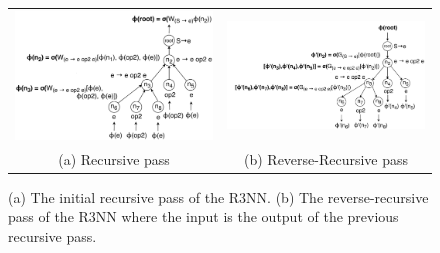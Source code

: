 \documentclass{article}
\begin{document}
\begin{figure}
    \begin{tabular}{cc}
        \begin{minipage}{0.45\linewidth}
            \includegraphics[scale=0.16]{figures/tree2.png}
        \end{minipage}
        &
        \begin{minipage}{0.55\linewidth}
            \includegraphics[scale=0.16]{figures/tree3.png}
        \end{minipage}
        \\
        (a) Recursive pass & (b) Reverse-Recursive pass
    \end{tabular}
    \caption{(a) The initial recursive pass of the R3NN. (b) The reverse-recursive pass of the R3NN where the input is the output of the previous recursive pass.}
    \label{r3nn}
\end{figure}
\end{document}
